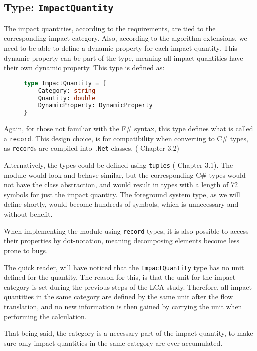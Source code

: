 \subsection{Type: \texttt{ImpactQuantity}}
The impact quantities, according to the requirements, are tied to the corresponding impact category. Also, according to the algorithm extensions, we need to be able to define a dynamic property for each impact quantity. This dynamic property can be part of the type, meaning all impact quantities have their own dynamic property. This type is defined as:

\begin{figure}[H]
\begin{lstlisting}[language=FSharp]
type ImpactQuantity = {
    Category: string
    Quantity: double
    DynamicProperty: DynamicProperty
}
\end{lstlisting}
\end{figure}

Again, for those not familiar with the F\# syntax, this type defines what is called a \texttt{record}. This design choice, is for compatibility when converting to C\# types, as \texttt{record}s are compiled into \texttt{.Net} classes. (\cite{FSharpBook} Chapter 3.2)

Alternatively, the types could be defined using \texttt{tuples} (\cite{FSharpBook} Chapter 3.1). The module would look and behave similar, but the corresponding C\# types would not have the class abstraction, and would result in types with a length of 72 symbols for just the impact quantity. The foreground system type, as we will define shortly, would become hundreds of symbols, which is unnecessary and without benefit.

When implementing the module using \texttt{record} types, it is also possible to access their properties by dot-notation, meaning decomposing elements become less prone to bugs.

The quick reader, will have noticed that the \texttt{ImpactQuantity} type has no unit defined for the quantity. The reason for this, is that the unit for the impact category is set during the previous steps of the LCA study. Therefore, all impact quantities in the same category are defined by the same unit after the flow translation, and no new information is then gained by carrying the unit when performing the calculation.

That being said, the category is a necessary part of the impact quantity, to make sure only impact quantities in the same category are ever accumulated.

